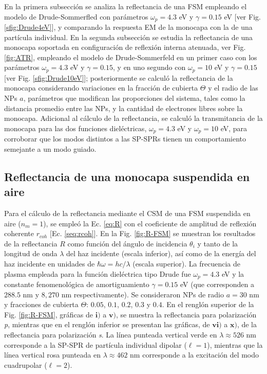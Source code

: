  En la primera subsección se analiza la reflectancia de una FSM empleando el modelo de Drude-Sommerfled con parámetros $\omega_p = 4.3$ eV y  $\gamma = 0.15$ eV [ver Fig. \ref{sfig:Drude4eV}], y comparando la respuesta EM de la monocapa con la de una partícula individual. En la segunda subsección se estudia la reflectancia de una monocapa soportada en configuración de reflexión interna atenuada, ver Fig. \ref{fig:ATR}, empleando el modelo de Drude-Sommerfeld en un primer caso con los parámetros  $\omega_p = 4.3$ eV y  $\gamma = 0.15$, y en uno segundo con $\omega_p = 10$ eV y $\gamma = 0.15$  [ver Fig. \ref{sfig:Drude10eV}]; posteriormente se calculó la reflectancia de la monocapa considerando  variaciones en la fracción de cubierta $\Theta$ y el radio de las NPs $a$, parámetros que modifican las proporciones del sistema, tales como la distancia promedio entre las NPs, y la cantidad de electrones libres sobre la monocapa. Adicional al cálculo de la reflectancia, se calculó la transmitancia de la monocapa para las dos funciones dieléctricas, $\omega_p =4.3$ eV y $\omega_p =10$ eV, para corroborar que los modos distintos a las SP-SPRs tienen un comportamiento semejante a un modo guiado. 
	
	\subsection{Reflectancia de una monocapa suspendida en aire}
	
Para el cálculo de la reflectancia mediante el CSM de una FSM suspendida en aire ($n_m=1$), se empleó la Ec.  \eqref{eq:R} con el coeficiente de amplitud de reflexión coherente $r_{coh}$ [Ec.  \eqref{seq:rcoh}].  En la Fig.  \ref{fig:R-FSM} se muestran los resultados de la reflectancia $R$ como función del ángulo de incidencia $\theta_i$ y tanto de la longitud de onda $\lambda$ del haz incidente (escala inferior), así como de la energía del haz incidente en unidades de $\hbar\omega = h c /\lambda$ (escala superior).  La frecuencia de plasma empleada para la función dieléctrica tipo Drude fue $\omega_p = 4. 3$ eV y la constante fenomenológica de amortiguamiento $\gamma = 0. 15$ eV (que corresponden a $288. 5$ nm  y $8,270$ nm respectivamente). Se consideraron NPs de radio $a=30$ nm y fracciones de cubierta $\Theta$: $0. 05$, $0. 1$, $0. 2$, $0. 3$ y $0. 4$. En el renglón superior de la Fig. \ref{fig:R-FSM}, gráficas de $\mathbf{i)}$ a $\mathbf{v)}$, se muestra la reflectancia para polarización \emph{p}, mientras que en el renglón inferior se presentan las gráficas, de $\mathbf{vi)}$ a $\mathbf{x)}$, de la reflectancia para polarización \emph{s}. La línea punteada vertical verde  en $\lambda \approx 526$ nm corresponde a la SP-SPR de partícula individual dipolar ($\ell = 1$), mientras que la línea vertical rosa punteada en $\lambda \approx 462$ nm corresponde a la excitación del modo cuadrupolar ($\ell=2$).
					
